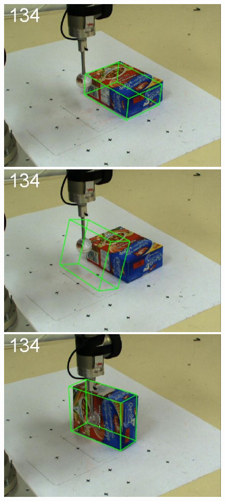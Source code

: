 \begin{figure}[htbp]
{\includegraphics[width=\imgAXwid]{./A2_2exp_399_3}
\includegraphics[width=\imgAXwid]{./A2_LWPR1_399_3}
\includegraphics[width=\imgAXwid]{./A2_2exp_87_3}
}
\end{figure}
